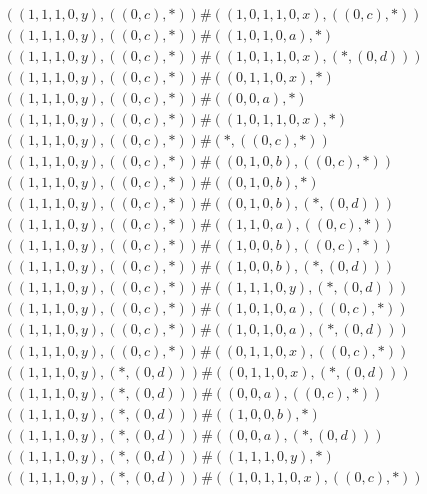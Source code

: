 \begin{align*}
	 & \qquad ((1, 1, 1, 0, y), ((0, c), *)) \# ((1, 0, 1, 1, 0, x), ((0, c), *)) \\ 
	 & \qquad ((1, 1, 1, 0, y), ((0, c), *)) \# ((1, 0, 1, 0, a), *) \\ 
	 & \qquad ((1, 1, 1, 0, y), ((0, c), *)) \# ((1, 0, 1, 1, 0, x), (*, (0, d))) \\ 
	 & \qquad ((1, 1, 1, 0, y), ((0, c), *)) \# ((0, 1, 1, 0, x), *) \\ 
	 & \qquad ((1, 1, 1, 0, y), ((0, c), *)) \# ((0, 0, a), *) \\ 
	 & \qquad ((1, 1, 1, 0, y), ((0, c), *)) \# ((1, 0, 1, 1, 0, x), *) \\ 
	 & \qquad ((1, 1, 1, 0, y), ((0, c), *)) \# (*, ((0, c), *)) \\ 
	 & \qquad ((1, 1, 1, 0, y), ((0, c), *)) \# ((0, 1, 0, b), ((0, c), *)) \\ 
	 & \qquad ((1, 1, 1, 0, y), ((0, c), *)) \# ((0, 1, 0, b), *) \\ 
	 & \qquad ((1, 1, 1, 0, y), ((0, c), *)) \# ((0, 1, 0, b), (*, (0, d))) \\ 
	 & \qquad ((1, 1, 1, 0, y), ((0, c), *)) \# ((1, 1, 0, a), ((0, c), *)) \\ 
	 & \qquad ((1, 1, 1, 0, y), ((0, c), *)) \# ((1, 0, 0, b), ((0, c), *)) \\ 
	 & \qquad ((1, 1, 1, 0, y), ((0, c), *)) \# ((1, 0, 0, b), (*, (0, d))) \\ 
	 & \qquad ((1, 1, 1, 0, y), ((0, c), *)) \# ((1, 1, 1, 0, y), (*, (0, d))) \\ 
	 & \qquad ((1, 1, 1, 0, y), ((0, c), *)) \# ((1, 0, 1, 0, a), ((0, c), *)) \\ 
	 & \qquad ((1, 1, 1, 0, y), ((0, c), *)) \# ((1, 0, 1, 0, a), (*, (0, d))) \\ 
	 & \qquad ((1, 1, 1, 0, y), ((0, c), *)) \# ((0, 1, 1, 0, x), ((0, c), *)) \\ 
	 & \qquad ((1, 1, 1, 0, y), (*, (0, d))) \# ((0, 1, 1, 0, x), (*, (0, d))) \\ 
	 & \qquad ((1, 1, 1, 0, y), (*, (0, d))) \# ((0, 0, a), ((0, c), *)) \\ 
	 & \qquad ((1, 1, 1, 0, y), (*, (0, d))) \# ((1, 0, 0, b), *) \\ 
	 & \qquad ((1, 1, 1, 0, y), (*, (0, d))) \# ((0, 0, a), (*, (0, d))) \\ 
	 & \qquad ((1, 1, 1, 0, y), (*, (0, d))) \# ((1, 1, 1, 0, y), *) \\ 
	 & \qquad ((1, 1, 1, 0, y), (*, (0, d))) \# ((1, 0, 1, 1, 0, x), ((0, c), *)) \\ 

\end{align*}
